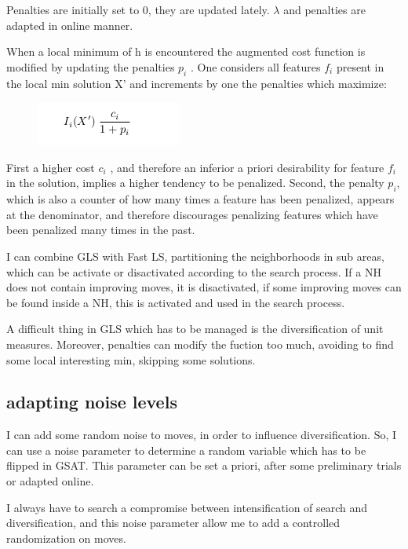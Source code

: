 \documentclass[10pt]{article}
\begin{document}
Penalties are initially set to 0, they are updated lately. $ \lambda $ and penalties are adapted in online manner. 

When a local minimum of h is encountered the augmented cost function is modified by updating the penalties $ p_i $ . One considers all features $ f_i $ present in the local min solution X' and increments by one the penalties which maximize:

\begin{figure}[H]
\includegraphics[scale=0.50]{penalties}
\centering
\end{figure}

First a higher cost $ c_i $ , and therefore an inferior a priori desirability for feature $ f_i $ in the solution, implies a higher tendency to be penalized.
Second, the penalty $ p_i $, which is also a counter of how many times a feature has been penalized, appears at the denominator, and therefore discourages penalizing features which have been penalized many times in the past.

I can combine GLS with Fast LS, partitioning the neighborhoods in sub areas, which can be activate or disactivated according to the search process. If a NH does not contain improving moves, it is disactivated, if some improving moves can be found inside a NH, this is activated and used in the search process. 

A difficult thing in GLS which has to be managed is the diversification of unit measures. Moreover, penalties can modify the fuction too much, avoiding to find some local interesting min, skipping some solutions.

\subsection{adapting noise levels}
I can add some random noise to moves, in order to influence diversification. So, I can use a noise parameter to determine a random variable which has to be flipped in GSAT. This parameter can be set a priori, after some preliminary trials or adapted online. 

I always have to search a compromise between intensification of search and diversification, and this noise parameter allow me to add a controlled randomization on moves.
\end{document}
